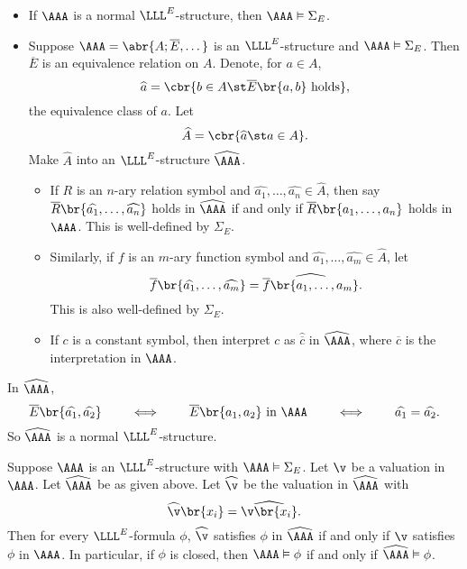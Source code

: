 \begin{remark}
\hfill
\begin{itemize}
\item If $ \AAA $ is a normal $ \LLL^E $-structure, then $ \AAA \vDash \Sigma_E $.
\item Suppose $ \AAA = \abr{A; \overline{E}, \dots} $ is an $ \LLL^E $-structure and $ \AAA \vDash \Sigma_E $. Then $ \overline{E} $ is an equivalence relation on $ A $. Denote, for $ a \in A $,
$$ \widehat{a} = \cbr{b \in A \st \overline{E}\br{a, b} \ \text{holds}}, $$
the equivalence class of $ a $. Let
$$ \widehat{A} = \cbr{\widehat{a} \st a \in A}. $$
Make $ \widehat{A} $ into an $ \LLL^E $-structure $ \widehat{\AAA} $.
\begin{itemize}
\item If $ R $ is an $ n $-ary relation symbol and $ \widehat{a_1}, \dots, \widehat{a_n} \in \widehat{A} $, then say $ \overline{R}\br{\widehat{a_1}, \dots, \widehat{a_n}} $ holds in $ \widehat{\AAA} $ if and only if $ \overline{R}\br{a_1, \dots, a_n} $ holds in $ \AAA $. This is well-defined by $ \Sigma_E $.
\item Similarly, if $ f $ is an $ m $-ary function symbol and $ \widehat{a_1}, \dots, \widehat{a_m} \in \widehat{A} $, let
$$ \overline{f}\br{\widehat{a_1}, \dots, \widehat{a_m}} = \widehat{\overline{f}\br{a_1, \dots, a_m}}. $$
This is also well-defined by $ \Sigma_E $.
\item If $ c $ is a constant symbol, then interpret $ c $ as $ \widehat{\overline{c}} $ in $ \widehat{\AAA} $, where $ \overline{c} $ is the interpretation in $ \AAA $.
\end{itemize}
\end{itemize}
\end{remark}

\begin{note*}
In $ \widehat{\AAA} $,
$$ \overline{E}\br{\widehat{a_1}, \widehat{a_2}} \qquad \iff \qquad \overline{E}\br{a_1, a_2} \ \text{in} \ \AAA \qquad \iff \qquad \widehat{a_1} = \widehat{a_2}. $$
So $ \widehat{\AAA} $ is a normal $ \LLL^E $-structure.
\end{note*}

\pagebreak

\begin{lemma}
\label{lem:2.6.3}
Suppose $ \AAA $ is an $ \LLL^E $-structure with $ \AAA \vDash \Sigma_E $. Let $ \v $ be a valuation in $ \AAA $. Let $ \widehat{\AAA} $ be as given above. Let $ \widehat{\v} $ be the valuation in $ \widehat{\AAA} $ with
$$ \widehat{\v}\br{x_i} = \widehat{\v\br{x_i}}. $$
Then for every $ \LLL^E $-formula $ \phi $, $ \widehat{\v} $ satisfies $ \phi $ in $ \widehat{\AAA} $ if and only if $ \v $ satisfies $ \phi $ in $ \AAA $. In particular, if $ \phi $ is closed, then $ \AAA \vDash \phi $ if and only if $ \widehat{\AAA} \vDash \phi $.
\end{lemma}

